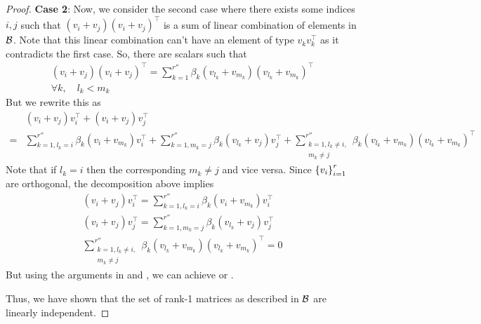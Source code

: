 \begin{proof}
    \textbf{Case 2}: Now, we consider the second case where there exists some indices $i,j$ such that $(v_i + v_j)(v_i+v_j)^{\top}$ is a sum of linear combination of elements in ${\mathcal{B}}$. Note that this linear combination can't have an element of type $v_kv_k^{\top}$ as it contradicts the first case. So, there are scalars such that
    \begin{gather}
        (v_i + v_j)(v_i+v_j)^{\top} = \sum_{k = 1}^{r''} \beta_{k}(v_{l_k} + v_{m_k})(v_{l_k} + v_{m_k})^{\top}\\
        \forall k,\quad l_k < m_k
    \end{gather}
    But we rewrite this as 
    \begin{align*}
        &(v_i + v_j)v_i^{\top} + (v_i + v_j)v_j^{\top}\\ = &\sum_{k = 1, l_k = i}^{r''} \beta_{k}(v_{i} + v_{m_k})v_{i}^{\top} + \sum_{k = 1, m_k = j}^{r''} \beta_{k}(v_{l_k} + v_{j})v_{j}^{\top} + \sum_{\substack{k = 1, l_k \neq i,\\ m_k \neq j}}^{r''} \beta_{k}(v_{l_k} + v_{m_k})(v_{l_k} + v_{m_k})^{\top}
    \end{align*}
    Note that if $l_k = i$ then the corresponding $m_k \neq j$ and vice versa. Since $\left\{v_i\right\}_{i=1}^r$ are orthogonal, the decomposition above implies
    \begin{gather}
        (v_i + v_j)v_i^{\top} = \sum_{k = 1, l_k = i}^{r''} \beta_{k}(v_{i} + v_{m_k})v_{i}^{\top} \label{eq: vplusv1}\\
        (v_i + v_j)v_j^{\top} =  \sum_{k = 1, m_k = j}^{r''} \beta_{k}(v_{l_k} + v_{j})v_{j}^{\top}\label{eq: vplusv2}\\
        \sum_{\substack{k = 1, l_k \neq i,\\ m_k \neq j}}^{r''} \beta_{k}(v_{l_k} + v_{m_k})(v_{l_k} + v_{m_k})^{\top} = 0
    \end{gather}
    But using the arguments in  and , we can achieve  or .

    Thus, we have shown that the set of rank-1 matrices as described in ${\mathcal{B}}$ are linearly independent.
\end{proof}




